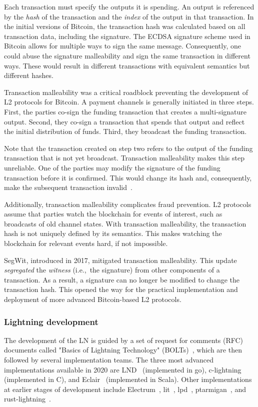Each transaction must specify the outputs it is spending.
An output is referenced by the \textit{hash} of the transaction and the \textit{index} of the output in that transaction.
In the initial versions of Bitcoin, the transaction hash was calculated based on all transaction data, including the signature.
The ECDSA signature scheme used in Bitcoin allows for multiple ways to sign the same message.
Consequently, one could abuse the signature malleability and sign the same transaction in different ways.
These would result in different transactions with equivalent semantics but different hashes.

Transaction malleability was a critical roadblock preventing the development of L2 protocols for Bitcoin.
A payment channels is generally initiated in three steps.
First, the parties co-sign the funding transaction that creates a multi-signature output.
Second, they co-sign a transaction that spends that output and reflect the initial distribution of funds.
Third, they broadcast the funding transaction.

Note that the transaction created on step two refers to the output of the funding transaction that is not yet broadcast.
Transaction malleability makes this step unreliable.
One of the parties may modify the signature of the funding transaction before it is confirmed.
This would change its hash and, consequently, make the subsequent transaction invalid~\cite{Harding2016}.

Additionally, transaction malleability complicates fraud prevention.
L2 protocols assume that parties watch the blockchain for events of interest, such as broadcasts of old channel states.
With transaction malleability, the transaction hash is not uniquely defined by its semantics.
This makes watching the blockchain for relevant events hard, if not impossible.

SegWit, introduced in 2017, mitigated transaction malleability.
This update \textit{segregated} the \textit{witness} (i.e.,~the signature) from other components of a transaction.
As a result, a signature can no longer be modified to change the transaction hash.
This opened the way for the practical implementation and deployment of more advanced Bitcoin-based L2 protocols.


\subsubsection*{Lightning development}

The development of the LN is guided by a set of request for comments (RFC) documents called "Basics of Lightning Technology" (BOLTs)~\cite{BOLT}, 
which are then followed by several implementation teams.
The three most advanced implementations available in 2020 are LND~\cite{LND} (implemented in go), c-lightning~\cite{clightning} (implemented in C), and Eclair~\cite{Eclair} (implemented in Scala).
Other implementations at earlier stages of development include
Electrum~\cite{ElectrumWebsite, ElectrumLightningAnnounce}, lit~\cite{lit}, lpd~\cite{lpd}, ptarmigan~\cite{ptarmigan}, and rust-lightning~\cite{rustlightning}.

